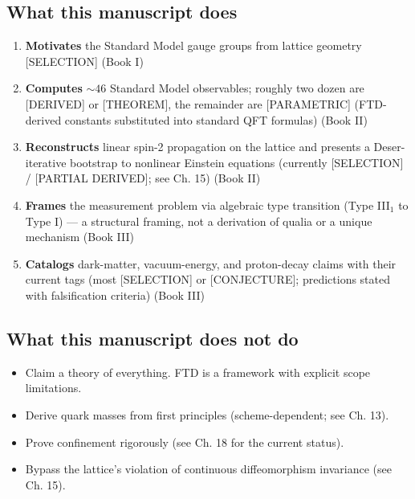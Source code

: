 \documentclass[
  11pt,
  letterpaper,
  twoside,
  openright]{book}
\providecommand{\tightlist}{%
  \setlength{\itemsep}{0pt}\setlength{\parskip}{0pt}}
\begin{document}
\subsection*{What this manuscript does}\label{what-this-manuscript-does}

\begin{enumerate}
\def\labelenumi{\arabic{enumi}.}
\tightlist
\item
  \textbf{Motivates} the Standard Model gauge groups from lattice
  geometry {[}SELECTION{]} (Book I)
\item
  \textbf{Computes} \(\sim 46\) Standard Model observables; roughly two
  dozen are {[}DERIVED{]} or {[}THEOREM{]}, the remainder are
  {[}PARAMETRIC{]} (FTD-derived constants substituted into standard QFT
  formulas) (Book II)
\item
  \textbf{Reconstructs} linear spin-2 propagation on the lattice and
  presents a Deser-iterative bootstrap to nonlinear Einstein equations
  (currently {[}SELECTION{]} / {[}PARTIAL DERIVED{]}; see Ch. 15) (Book
  II)
\item
  \textbf{Frames} the measurement problem via algebraic type transition
  (Type III\(_1\) to Type I) --- a structural framing, not a derivation
  of qualia or a unique mechanism (Book III)
\item
  \textbf{Catalogs} dark-matter, vacuum-energy, and proton-decay claims
  with their current tags (most {[}SELECTION{]} or {[}CONJECTURE{]};
  predictions stated with falsification criteria) (Book III)
\end{enumerate}

\subsection*{What this manuscript does not
do}\label{what-this-manuscript-does-not-do}

\begin{itemize}
\tightlist
\item
  Claim a theory of everything. FTD is a framework with explicit scope
  limitations.
\item
  Derive quark masses from first principles (scheme-dependent; see Ch.
  13).
\item
  Prove confinement rigorously (see Ch. 18 for the current status).
\item
  Bypass the lattice's violation of continuous diffeomorphism invariance
  (see Ch. 15).
\end{itemize}
\end{document}
